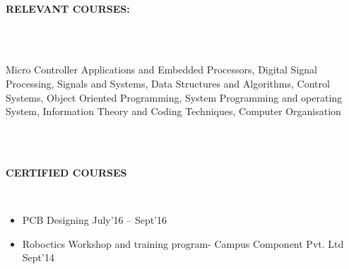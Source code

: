 \documentclass[a4paper,12pt]{report}
\begin{document}
\begin{adjustwidth}{-0.59in}{-0.52in}
\\
\textbf{RELEVANT COURSES:} 
\end{adjustwidth}
 \\
\begin{adjustwidth}{-0.59in}{0.0in}
\\
Micro Controller Applications and Embedded Processors, Digital Signal Processing, Signals and Systems, Data Structures and Algorithms, Control Systems, Object Oriented Programming, System Programming and operating System, Information Theory and Coding Techniques, Computer Organisation
\end{adjustwidth}
 \\
\vspace{12pt}


\begin{adjustwidth}{-0.59in}{-0.52in}
\\
\textbf{CERTIFIED COURSES}
\end{adjustwidth}
 \\
\begin{itemize}
\item PCB Designing \hspace*{20pt}  \hspace*{20pt}        \hspace*{20pt}                                                                                            July’16 – Sept’16 \\
\item Roboctics Workshop and training program- Campus Component Pvt. Ltd         \hspace*{20pt}                    Sept’14 \\
\vspace{12pt}
\end{itemize}
\end{document}
